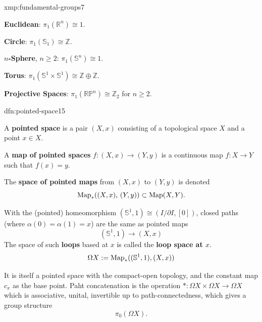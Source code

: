 \documentclass[landscape, 8pt]{extarticle}
\begin{document}
\begin{multicols*}{3}
\vspace{-7pt}
\begin{xmp}{xmp:fundamental-groups}{7}
	\vspace{-2pt}
	\begin{itemize-zero}
		\begin{multicols}{2}
	    \item \textbf{Euclidean}: $\pi_{1}(\mathbb{R}^{n}) \cong 1$.
	    \item \textbf{Circle}: $\pi_{1}(\mathbb{S}_{1}) \cong \mathbb{Z}$.
	    \item \textbf{$n$-Sphere}, $n \ge 2$: $\pi_{1}(\mathbb{S}^{n}) \cong 1$.
	    \item \textbf{Torus}: $\pi_{1}(\mathbb{S}^{1} \times \mathbb{S}^{1}) \cong \mathbb{Z} \oplus \mathbb{Z}$.
		\end{multicols}
	    \item \textbf{Projective Spaces}: $\pi_{1}(\mathbb{RP}^{n}) \cong \mathbb{Z}_{2}$ for $n \ge 2$.
	\end{itemize-zero}
\end{xmp}

\vspace{-7pt}
\begin{dfn}{dfn:pointed-space}{15}
	\vspace{-2pt}
	\begin{itemize-zero}
	    \item A \textbf{pointed space} is a pair $(X, x)$ consisting of a topological space $X$ and a point $x\in X$.
	\vspace{-2pt}
	    \item A \textbf{map of pointed spaces} $f : (X, x) \to (Y, y)$ is a continuous map $f : X \to Y$ such that $f(x) = y$.
	\vspace{-2pt}
	    \item The \textbf{space of pointed maps} from $(X, x)$ to $(Y, y)$ is denoted
			\[\operatorname{Map}_{\ast}((X, x),\, (Y, y)) \subset \operatorname{Map}(X, Y).\]
	\end{itemize-zero}
	\par\vspace{-5pt}
	With the (pointed) homeomorphism $(\mathbb{S}^{1}, 1) \cong (I /\partial I, [0])$, closed paths (where $\alpha(0) = \alpha(1) = x$) are the same as pointed maps
	\[(\mathbb{S}^{1}, 1) \to (X, x)\]
	The space of such \textbf{loops} based at $x$ is called the \textbf{loop space at $x$}.
	\[\Omega X := \operatorname{Map}_{\ast} ((\mathbb{S}^{1}, 1), (X, x))\]
	\par\vspace{-2pt}
	It is itself a pointed space with the compact-open topology, and the constant map $c_{x}$ as the base point. Paht concatenation is the operation $\ast : \Omega X \times \Omega X \to \Omega X$ which is associative, unital, invertible up to path-connectedness, which gives a group structure
	\[\pi_{0}(\Omega X).\]
\end{dfn}


\end{multicols*}
\end{document}
